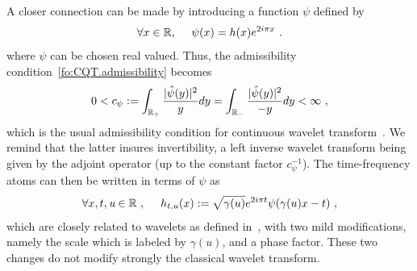 A closer connection can be made by introducing a function $\psi$ defined by
\begin{equation}
\label{fo:hr}
    \forall x\in\mathbb{R},\quad \ \psi(x) = h(x)e^{2i\pi x}\ .
\end{equation}
where $\psi$ can be chosen real valued. Thus, the admissibility condition~\eqref{fo:CQT.admissibility} becomes
\begin{equation}
    0<c_\psi := \int_{\mathbb{R}_+}\frac{|\hat{\psi}(y)|^2}{y}dy = \int_{\mathbb{R}_-}\frac{|\hat{\psi}(y)|^2}{-y}dy<\infty\ ,
    \label{fo:CWT.admissibility}
\end{equation}
which is the usual admissibility condition for continuous wavelet transform~\cite{Grossmann1985transforms,Grossmann1986transforms}. We remind that the latter insures invertibility, a left inverse wavelet transform being given by the adjoint operator (up to the constant factor $c_\psi^{-1}$). 
The time-frequency atoms can then be written in terms of $\psi$ as
\begin{equation}
	\forall x,t,\textit{u}\in\mathbb{R}\ ,\quad \ h_{t,u}(x) := \sqrt{\gamma(u)}e^{2i\pi t}\psi(\gamma(u)x-t)\ ,
\end{equation}
which are closely related to wavelets as defined in~\cite{Grossmann1984decomposition}, with two mild modifications, namely the scale which is labeled by $\gamma(u)$, and a phase factor. These two changes do not modify strongly the classical wavelet transform.

